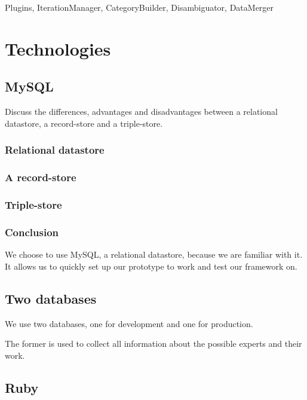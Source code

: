 Plugins, IterationManager, CategoryBuilder, Disambiguator, DataMerger

\section{Technologies}

\subsection{MySQL}

Discuss the differences, advantages and disadvantages between a relational datastore, a record-store and a triple-store.

\subsubsection{Relational datastore}

\subsubsection{A record-store}

\subsubsection{Triple-store}

\subsubsection{Conclusion}

We choose to use MySQL, a relational datastore, because we are familiar with it. It allows us to quickly set up our prototype to work and test our framework on.

\subsection{Two databases}

We use two databases, one for development and one for production.

The former is used to collect all information about the possible experts and their work. 

\subsection{Ruby}
